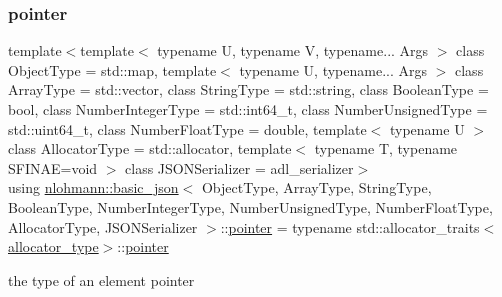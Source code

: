 \subsubsection{\texorpdfstring{pointer}{pointer}}
{\footnotesize\ttfamily template$<$template$<$ typename U, typename V, typename... Args $>$ class Object\+Type = std\+::map, template$<$ typename U, typename... Args $>$ class Array\+Type = std\+::vector, class String\+Type  = std\+::string, class Boolean\+Type  = bool, class Number\+Integer\+Type  = std\+::int64\+\_\+t, class Number\+Unsigned\+Type  = std\+::uint64\+\_\+t, class Number\+Float\+Type  = double, template$<$ typename U $>$ class Allocator\+Type = std\+::allocator, template$<$ typename T, typename S\+F\+I\+N\+A\+E=void $>$ class J\+S\+O\+N\+Serializer = adl\+\_\+serializer$>$ \\
using \mbox{\hyperlink{classnlohmann_1_1basic__json}{nlohmann\+::basic\+\_\+json}}$<$ Object\+Type, Array\+Type, String\+Type, Boolean\+Type, Number\+Integer\+Type, Number\+Unsigned\+Type, Number\+Float\+Type, Allocator\+Type, J\+S\+O\+N\+Serializer $>$\+::\mbox{\hyperlink{classnlohmann_1_1basic__json_aefee1f777198c68724bd127e0c8abbe4}{pointer}} =  typename std\+::allocator\+\_\+traits$<$\mbox{\hyperlink{classnlohmann_1_1basic__json_a86ce930490cf7773b26f5ef49c04a350}{allocator\+\_\+type}}$>$\+::\mbox{\hyperlink{classnlohmann_1_1basic__json_aefee1f777198c68724bd127e0c8abbe4}{pointer}}}



the type of an element pointer 

\mbox{\label{classnlohmann_1_1basic__json_ac6a5eddd156c776ac75ff54cfe54a5bc}} 

